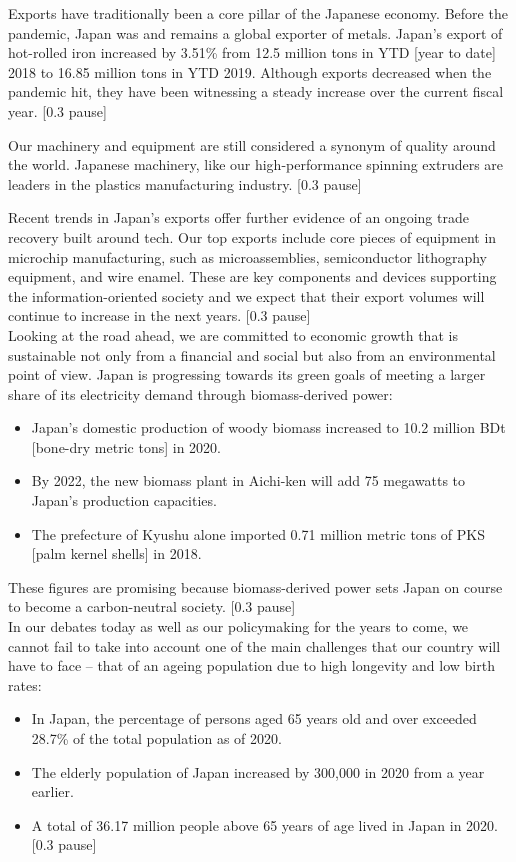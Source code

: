Exports have traditionally been a core pillar of the Japanese economy. Before the pandemic, Japan was and remains a global exporter of metals. Japan’s export of hot-rolled iron increased by 3.51\% from 12.5 million tons in YTD [year to date] 2018 to 16.85 million tons in YTD 2019. Although exports decreased when the pandemic hit, they have been witnessing a steady increase over the current fiscal year. [0.3 pause] \\ 

\begin{sloppypar}
Our machinery and equipment are still considered a synonym of quality around the world. Japanese machinery, like our high-performance spinning extruders are leaders in the plastics manufacturing industry. [0.3 pause] \\
\end{sloppypar}

Recent trends in Japan's exports offer further evidence of an ongoing trade recovery built around tech. Our top exports include core pieces of equipment in microchip manufacturing, such as microassemblies, semiconductor lithography equipment, and wire enamel. These are key components and devices supporting the information-oriented society and we expect that their export volumes will continue to increase in the next years. [0.3 pause] \\

Looking at the road ahead, we are committed to economic growth that is sustainable not only from a financial and social but also from an environmental point of view. Japan is progressing towards its green goals of meeting a larger share of its electricity demand through biomass-derived power: 
\begin{itemize}
    \item Japan's domestic production of woody biomass increased to 10.2 million BDt [bone-dry metric tons] in 2020. 
    \item By 2022, the new biomass plant in Aichi-ken will add 75 megawatts to Japan’s production capacities. 
    \item The prefecture of Kyushu alone imported 0.71 million metric tons of PKS [palm kernel shells] in 2018. 
\end{itemize}
These figures are promising because biomass-derived power sets Japan on course to become a carbon-neutral society. [0.3 pause] \\

In our debates today as well as our policymaking for the years to come, we cannot fail to take into account one of the main challenges that our country will have to face – that of an ageing population due to high longevity and low birth rates: 
\begin{itemize}
    \item In Japan, the percentage of persons aged 65 years old and over exceeded 28.7\% of the total population as of 2020.
    \item The elderly population of Japan increased by 300,000 in 2020 from a year earlier. 
    \item A total of 36.17 million people above 65 years of age lived in Japan in 2020. [0.3 pause] 
\end{itemize}

